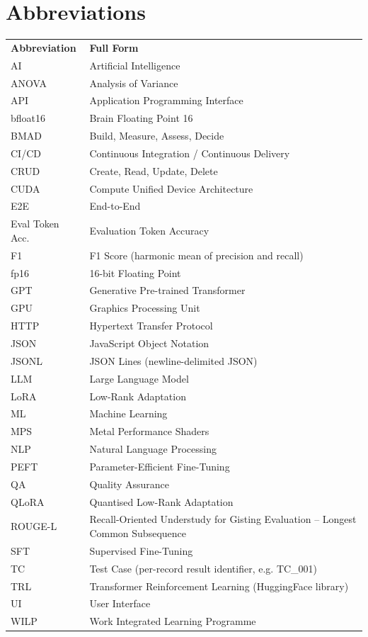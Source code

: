 \chapter*{Abbreviations}

\begin{longtable}[]{@{}ll@{}}
\toprule
\endhead
\textbf{Abbreviation} & \textbf{Full Form} \\
AI & Artificial Intelligence \\
ANOVA & Analysis of Variance \\
API & Application Programming Interface \\
bfloat16 & Brain Floating Point 16 \\
BMAD & Build, Measure, Assess, Decide \\
CI/CD & Continuous Integration / Continuous Delivery \\
CRUD & Create, Read, Update, Delete \\
CUDA & Compute Unified Device Architecture \\
E2E & End-to-End \\
Eval Token Acc. & Evaluation Token Accuracy \\
F1 & F1 Score (harmonic mean of precision and recall) \\
fp16 & 16-bit Floating Point \\
GPT & Generative Pre-trained Transformer \\
GPU & Graphics Processing Unit \\
HTTP & Hypertext Transfer Protocol \\
JSON & JavaScript Object Notation \\
JSONL & JSON Lines (newline-delimited JSON) \\
LLM & Large Language Model \\
LoRA & Low-Rank Adaptation \\
ML & Machine Learning \\
MPS & Metal Performance Shaders \\
NLP & Natural Language Processing \\
PEFT & Parameter-Efficient Fine-Tuning \\
QA & Quality Assurance \\
QLoRA & Quantised Low-Rank Adaptation \\
ROUGE-L & Recall-Oriented Understudy for Gisting Evaluation -- Longest
Common Subsequence \\
SFT & Supervised Fine-Tuning \\
TC & Test Case (per-record result identifier, e.g. TC\_001) \\
TRL & Transformer Reinforcement Learning (HuggingFace library) \\
UI & User Interface \\
WILP & Work Integrated Learning Programme \\
\bottomrule
\end{longtable}

